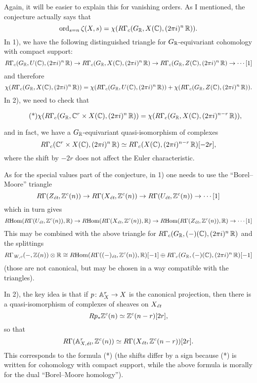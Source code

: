 \documentclass{article}
\theoremstyle{plain}
\begin{document}
Again, it will be easier to explain this for vanishing orders. As I mentioned,
the conjecture actually says that
$$\ord_{s=n} \zeta (X,s) = \chi (R\Gamma_c (G_\RR, X(\CC), (2\pi i)^n\,\RR)).$$
In 1), we have the following distinguished triangle for $G_\RR$-equivariant
cohomology with compact support:
\[ R\Gamma_c (G_\RR, U(\CC), (2\pi i)^n\,\RR) \to
  R\Gamma_c (G_\RR, X(\CC), (2\pi i)^n\,\RR) \to
  R\Gamma_c (G_\RR, Z(\CC), (2\pi i)^n\,\RR) \to \cdots [1] \]
and therefore
\[ \chi (R\Gamma_c (G_\RR, X(\CC), (2\pi i)^n\,\RR)) =
  \chi (R\Gamma_c (G_\RR, U(\CC), (2\pi i)^n\,\RR)) +
  \chi (R\Gamma_c (G_\RR, Z(\CC), (2\pi i)^n\,\RR)). \]
In 2), we need to check that

\[ \tag{*} \chi (R\Gamma_c (G_\RR, \CC^r \times X(\CC), (2\pi i)^n\,\RR)) =
  \chi (R\Gamma_c (G_\RR, X(\CC), (2\pi i)^{n-r}\,\RR)), \]

\noindent and in fact, we have a $G_\RR$-equivariant quasi-isomorphism of
complexes
\[ R\Gamma_c (\CC^r \times X(\CC), (2\pi i)^n\,\RR) \quiso
  R\Gamma_c (X(\CC), (2\pi i)^{n-r}\,\RR) [-2r], \]
where the shift by $-2r$ does not affect the Euler characteristic.

\vspace{1em}

As for the special values part of the conjecture, in 1) one needs to use the
``Borel--Moore'' triangle
\[ R\Gamma (Z_\text{\it ét}, \ZZ^c (n)) \to
  R\Gamma (X_\text{\it ét}, \ZZ^c (n)) \to
  R\Gamma (U_\text{\it ét}, \ZZ^c (n)) \to \cdots [1] \]
which in turn gives
\[ \RHom(R\Gamma(U_\text{\it ét}, \ZZ^c (n)), \RR) \to
  \RHom(R\Gamma(X_\text{\it ét}, \ZZ^c (n)), \RR) \to
  \RHom(R\Gamma(Z_\text{\it ét}, \ZZ^c (n)), \RR) \to \cdots [1] \]
This may be combined with the above triangle for
$R\Gamma_c (G_\RR, (-)(\CC), (2\pi i)^n\,\RR)$ and the splittings
\[ R\Gamma_\text{\it W,c} (-,\ZZ(n)) \otimes \RR \isom
  \RHom (R\Gamma ((-)_\text{\it ét}, \ZZ^c (n)), \RR) [-1]
  \oplus
  R\Gamma_c (G_\RR, (-) (\CC), (2\pi i)^n\,\RR) [-1] \]
(those are not canonical, but may be chosen in a way compatible with the
triangles).

In 2), the key idea is that if $p\colon \AA^r_X \to X$ is the canonical
projection, then there is a quasi-isomorphism of complexes of sheaves on
$X_\text{\it ét}$
$$R p_* \ZZ^c (n) \quiso \ZZ^c (n - r) [2r],$$
so that
\[ R\Gamma (\AA^r_{X,\text{\it ét}}, \ZZ^c (n)) \quiso
  R\Gamma (X_\text{\it ét}, \ZZ^c (n - r)) [2r]. \]
This corresponds to the formula (*) (the shifts differ by a sign because (*) is
written for cohomology with compact support, while the above formula is morally
for the dual ``Borel--Moore homology'').
\end{document}
